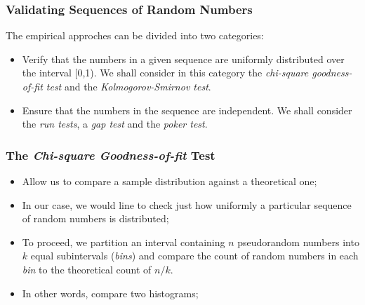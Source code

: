 \begin{frame}
    \frametitle{Validating Sequences of Random Numbers}

    The empirical approches can be divided into two categories:

    \begin{itemize}

        \item Verify that the numbers in a given sequence are uniformly distributed over the interval [0,1). We shall
        consider in this category the \textit{chi-square goodness-of-fit test} and the \textit{Kolmogorov-Smirnov test}.

        \item Ensure that the numbers in the sequence are independent. We shall consider the \textit{run tests}, 
        a \textit{gap test} and the \textit{poker test}. 

    \end{itemize}


\end{frame}



\begin{frame}
    \frametitle{The \textit{Chi-square Goodness-of-fit} Test}
    
    \begin{itemize}

        \item Allow us to compare a sample distribution against a theoretical one;

        \item In our case, we would line to check just how uniformly a particular sequence
        of random numbers is distributed;


        \item To proceed, we partition an interval containing $n$ pseudorandom numbers into 
        $k$ equal subintervals (\textit{bins}) and compare the count of random numbers in 
        each \textit{bin} to the theoretical count of $n/k$.

        \item In other words, compare two histograms;
    
    \end{itemize}


\end{frame}


